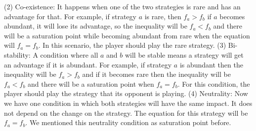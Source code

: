 \documentclass{article}
\begin{document}
(2) Co-existence: It happens when one of the two strategies is rare and has an advantage for that. For example, if strategy $a$ is rare, then $f_a>f_b$ if $a$ becomes abundant, it will lose its advantage, so the inequality will be  $f_a<f_b$ and there will be a saturation point while becoming abundant from rare when the equation will $f_a=f_b$. In this scenario, the player should play the rare strategy.
(3) Bi-stability: A condition where all $a$ and $b$ will be stable means a strategy will get an advantage if it is abundant. For example, if strategy $a$ is abundant then the inequality will be $f_a>f_b$ and if it becomes rare then the inequality will be $f_a<f_b$ and there will be a saturation point when $f_a=f_b$. For this condition, the player should play the strategy that its opponent is playing.
(4) Neutrality: Now we have one condition in which both strategies will have the same impact. It does not depend on the change on the strategy. The equation for this strategy will be $f_a=f_b$. We mentioned this neutrality condition as saturation point before.
        




 
\end{document}
